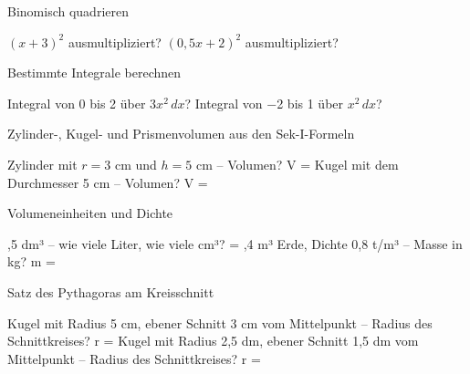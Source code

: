 \setcounter{aufgabe}{0}

\begin{aufgabe}{Binomisch quadrieren}
\begin{teile}
\teil $(x + 3)^2$ ausmultipliziert? \leerfeld
\teil $(0{,}5x + 2)^2$ ausmultipliziert? \leerfeld
\end{teile}
\end{aufgabe}

\begin{aufgabe}{Bestimmte Integrale berechnen}
\begin{teile}
\teil Integral von 0 bis 2 über $3x^2\,dx$? \leerfeld
\teil Integral von −2 bis 1 über $x^2\,dx$? \leerfeld
\end{teile}
\end{aufgabe}

\begin{aufgabe}{Zylinder-, Kugel- und Prismenvolumen aus den Sek-I-Formeln}
\begin{teile}
\teil Zylinder mit $r = 3$ cm und $h = 5$ cm – Volumen? V = \leerfeld[cm³]
\teil Kugel mit dem Durchmesser 5 cm – Volumen? V = \leerfeld[cm³]
\end{teile}
\end{aufgabe}

\begin{aufgabe}{Volumeneinheiten und Dichte}
\begin{teile}
,5 dm³ – wie viele Liter, wie viele cm³? \leerfeld[l] = \leerfeld[cm³]
,4 m³ Erde, Dichte 0,8 t/m³ – Masse in kg? m = \leerfeld[kg]
\end{teile}
\end{aufgabe}

\begin{aufgabe}{Satz des Pythagoras am Kreisschnitt}
\begin{teile}
\teil Kugel mit Radius 5 cm, ebener Schnitt 3 cm vom Mittelpunkt – Radius des Schnittkreises? r = \leerfeld[cm]
\teil Kugel mit Radius 2,5 dm, ebener Schnitt 1,5 dm vom Mittelpunkt – Radius des Schnittkreises? r = \leerfeld[dm]
\end{teile}
\end{aufgabe}

